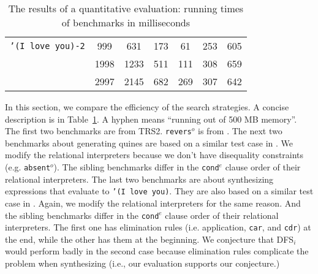 \documentclass[acmlarge]{acmart}
\newcommand{\conde}{\texttt{cond$^e$}}
\newcommand{\reverso}{\texttt{revers$^o$}}
\newcommand{\DFSi }[0]{DFS$_{i}$}
\begin{document}
\begin{table}
\begin{tabular}{|c|c|c|c|c|c|c|}
		\hline
\texttt{'(I love you)-2}&  999 & 631 & 173 &  61 & 253 & 605 \\
						& 1998 &1233 & 511 & 111 & 308 & 659 \\
						& 2997 &2145 & 682 & 269 & 307 & 642 \\ 
		\hline 
	\end{tabular}
	\caption{The results of a quantitative evaluation: running times of 
	benchmarks in milliseconds}
	\label{compare-efficiency}
\end{table}

In this section, we compare the efficiency of the search strategies. A concise 
description is in Table~\ref{compare-efficiency}. A hyphen means ``running out
of 500 MB memory''. The first two benchmarks are from 
TRS2. \reverso{} is from 
\citet{rozplokhas2018improving}. 
The next two benchmarks about generating quines are based on a similar test 
case in 
\citet{byrd2017unified}. We modify the relational interpreters because we don't 
have disequality constraints (e.g. \texttt{absent$^o$}). The sibling 
benchmarks differ in the \conde{} clause order of their relational 
interpreters.
The last two benchmarks are about synthesizing expressions that 
evaluate to \texttt{'(I love you)}. 
They are also based on a similar test case in \mbox{\citet{byrd2017unified}}. 
Again, 
we modify the relational interpreters for the same reason. And the sibling 
benchmarks differ in the \conde{} clause order of their relational 
interpreters. The first one has elimination rules (i.e. application, 
\texttt{car}, and \texttt{cdr}) at the end, while the other has them at the 
beginning. We conjecture that \DFSi{} would perform badly in the second case 
because elimination rules complicate the problem when synthesizing (i.e., our 
evaluation supports our conjecture.)
\end{document}
